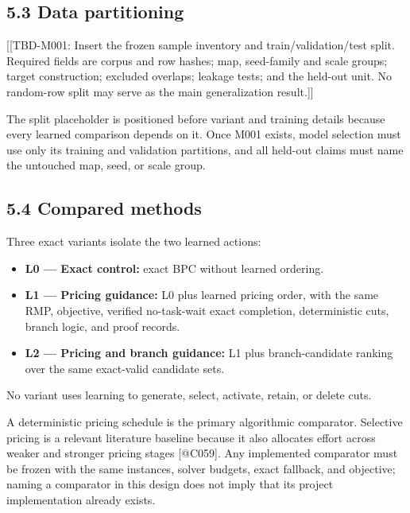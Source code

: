 \documentclass[
  11pt,
]{article}
\providecommand{\tightlist}{%
  \setlength{\itemsep}{0pt}\setlength{\parskip}{0pt}}
\begin{document}
\hypertarget{data-partitioning}{%
\subsection{5.3 Data partitioning}\label{data-partitioning}}

{[}{[}TBD-M001: Insert the frozen sample inventory and
train/validation/test split. Required fields are corpus and row hashes;
map, seed-family and scale groups; target construction; excluded
overlaps; leakage tests; and the held-out unit. No random-row split may
serve as the main generalization result.{]}{]}

The split placeholder is positioned before variant and training details
because every learned comparison depends on it. Once M001 exists, model
selection must use only its training and validation partitions, and all
held-out claims must name the untouched map, seed, or scale group.

\hypertarget{compared-methods}{%
\subsection{5.4 Compared methods}\label{compared-methods}}

Three exact variants isolate the two learned actions:

\begin{itemize}
\tightlist
\item
  \textbf{L0 --- Exact control:} exact BPC without learned ordering.
\item
  \textbf{L1 --- Pricing guidance:} L0 plus learned pricing order, with
  the same RMP, objective, verified no-task-wait exact completion,
  deterministic cuts, branch logic, and proof records.
\item
  \textbf{L2 --- Pricing and branch guidance:} L1 plus branch-candidate
  ranking over the same exact-valid candidate sets.
\end{itemize}

No variant uses learning to generate, select, activate, retain, or
delete cuts.

A deterministic pricing schedule is the primary algorithmic comparator.
Selective pricing is a relevant literature baseline because it also
allocates effort across weaker and stronger pricing stages {[}@C059{]}.
Any implemented comparator must be frozen with the same instances,
solver budgets, exact fallback, and objective; naming a comparator in
this design does not imply that its project implementation already
exists.
\end{document}
